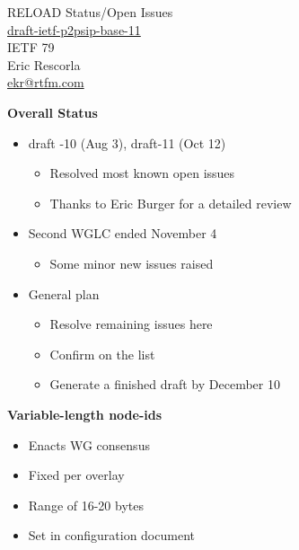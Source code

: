 \documentclass[helvetica]{seminar}
\newcommand{\heading}[1]{%
  \begin{center} 
    \large\bf 
    #1 
  \end{center} 
  \vspace{.4 in}}
\begin{document}
\begin{slide}
\begin{center}
\vspace{1 in}
\LARGE{{\bf}RELOAD Status/Open Issues}\\
\large{\url{draft-ietf-p2psip-base-11}}\\
\large{{IETF 79}} \\
\vspace{3em}
\large{Eric Rescorla}\\
\large{\url{ekr@rtfm.com}}
\end{center}
\end{slide}


\centerslidesfalse 


\begin{slide}
\heading{Overall Status}

\begin{itemize}
\item draft -10 (Aug 3), draft-11 (Oct 12)
\begin{itemize}
\item Resolved most known open issues  
\item Thanks to Eric Burger for a detailed review
\end{itemize}
\item Second WGLC ended November 4
\begin{itemize}
\item Some minor new issues raised
\end{itemize}
\item General plan
\begin{itemize}
\item Resolve remaining issues here
\item Confirm on the list
\item Generate a finished draft by December 10
\end{itemize}
\end{itemize}
\end{slide}


\begin{slide}
\heading{Variable-length node-ids}

\begin{itemize}
\item Enacts WG consensus
\item Fixed per overlay
\item Range of 16-20 bytes
\item Set in configuration document
\end{itemize}

\end{slide}
\end{document}
